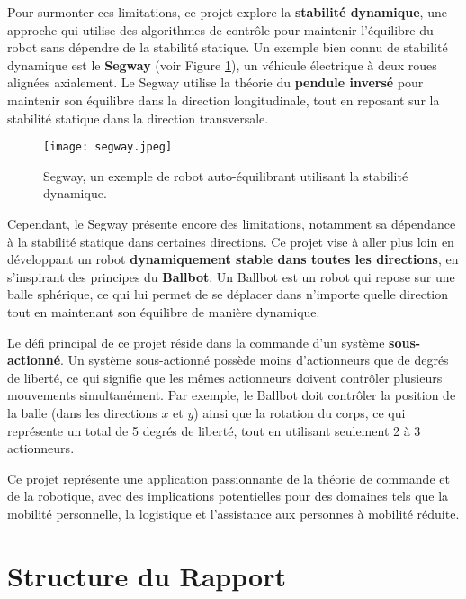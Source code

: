 \documentclass{report}
\begin{document}
Pour surmonter ces limitations, ce projet explore la \textbf{stabilité dynamique}, une approche qui utilise des algorithmes de contrôle pour maintenir l’équilibre du robot sans dépendre de la stabilité statique. Un exemple bien connu de stabilité dynamique est le \textbf{Segway} (voir Figure \ref{fig:segway}), un véhicule électrique à deux roues alignées axialement. Le Segway utilise la théorie du \textbf{pendule inversé} pour maintenir son équilibre dans la direction longitudinale, tout en reposant sur la stabilité statique dans la direction transversale.

\begin{figure}[h!]
    \centering
    \texttt{[image: segway.jpeg]} %
    \caption{Segway, un exemple de robot auto-équilibrant utilisant la stabilité dynamique.}
    \label{fig:segway}
\end{figure}
\vspace{4cm}
Cependant, le Segway présente encore des limitations, notamment sa dépendance à la stabilité statique dans certaines directions. Ce projet vise à aller plus loin en développant un robot \textbf{dynamiquement stable dans toutes les directions}, en s’inspirant des principes du \textbf{Ballbot}. Un Ballbot est un robot qui repose sur une balle sphérique, ce qui lui permet de se déplacer dans n’importe quelle direction tout en maintenant son équilibre de manière dynamique.

Le défi principal de ce projet réside dans la commande d’un système \textbf{sous-actionné}. Un système sous-actionné possède moins d’actionneurs que de degrés de liberté, ce qui signifie que les mêmes actionneurs doivent contrôler plusieurs mouvements simultanément. Par exemple, le Ballbot doit contrôler la position de la balle (dans les directions \(x\) et \(y\)) ainsi que la rotation du corps, ce qui représente un total de 5 degrés de liberté, tout en utilisant seulement 2 à 3 actionneurs.

Ce projet représente une application passionnante de la théorie de commande et de la robotique, avec des implications potentielles pour des domaines tels que la mobilité personnelle, la logistique et l’assistance aux personnes à mobilité réduite.

\section*{Structure du Rapport}
\end{document}
